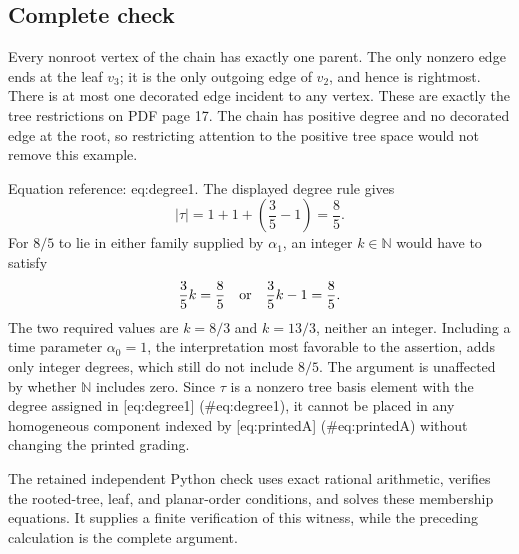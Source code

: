 \documentclass[10pt]{article}
\begin{document}
\subsection*{Complete check}
Every nonroot vertex of the chain has exactly one parent. The only nonzero edge ends at the leaf \(v_3\); it is the only outgoing edge of \(v_2\), and hence is rightmost. There is at most one decorated edge incident to any vertex. These are exactly the tree restrictions on PDF page 17. The chain has positive degree and no decorated edge at the root, so restricting attention to the positive tree space would not remove this example.\par
Equation reference: eq:degree1. The displayed degree rule gives \[
 |\tau|=1+1+\left(\frac35-1\right)=\frac85.\] For \(8/5\) to lie in either family supplied by \(\alpha_1\), an integer \(k\in\mathbb N\) would have to satisfy \[\frac35k=\frac85 \quad\hbox{or}\quad
 \frac35k-1=\frac85.\] The two required values are \(k=8/3\) and \(k=13/3\), neither an integer. Including a time parameter \(\alpha_0=1\), the interpretation most favorable to the assertion, adds only integer degrees, which still do not include \(8/5\). The argument is unaffected by whether \(\mathbb N\) includes zero. Since \(\tau\) is a nonzero tree basis element with the degree assigned in [eq:degree1] (\#eq:degree1), it cannot be placed in any homogeneous component indexed by [eq:printedA] (\#eq:printedA) without changing the printed grading.\par
The retained independent Python check uses exact rational arithmetic, verifies the rooted-tree, leaf, and planar-order conditions, and solves these membership equations. It supplies a finite verification of this witness, while the preceding calculation is the complete argument.\par
\end{document}
